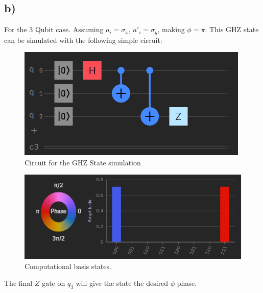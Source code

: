 \documentclass{article}
\begin{document}
\subsection*{b)}
For the 3 Qubit case. Assuming $a_i=\sigma_x$, $a'_i=\sigma_y$, making $ \phi=\pi$.      
This GHZ state can be simulated with
the following simple circuit:
\begin{figure} [H]
    \centering
    \includegraphics[scale = 0.75]{1.png}
    \caption{Circuit for the GHZ State simulation}
    \label{fig:my_label}
\end{figure}
\begin{figure} [H]
    \centering
    \includegraphics[scale = 0.65]{3.png}
    \caption{Computational basis states.}
    \label{fig:my_label}
\end{figure}

The final $\boxed{Z}$ gate on $q_{3}$ will give the state the desired $\phi$ phase.\\
\end{document}
